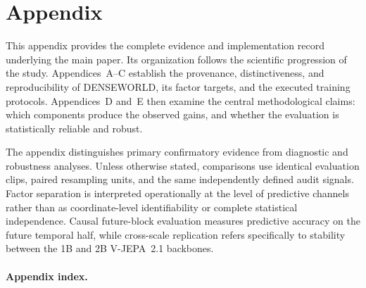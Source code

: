 \appendix
\setcounter{secnumdepth}{2} %

\section*{Appendix}

This appendix provides the complete evidence and implementation record
underlying the main paper. Its organization follows the scientific
progression of the study. Appendices~A--C establish the provenance,
distinctiveness, and reproducibility of DENSEWORLD, its factor targets,
and the executed training protocols. Appendices~D and~E then examine the
central methodological claims: which components produce the observed
gains, and whether the evaluation is statistically reliable and robust.

The appendix distinguishes primary confirmatory evidence from
diagnostic and robustness analyses. Unless otherwise stated,
comparisons use identical evaluation clips, paired resampling units,
and the same independently defined audit signals. Factor separation is
interpreted operationally at the level of predictive channels rather
than as coordinate-level identifiability or complete statistical
independence. Causal future-block evaluation measures predictive accuracy
on the future temporal half, while cross-scale replication refers specifically to
stability between the 1B and 2B V-JEPA~2.1 backbones.

\paragraph{Appendix index.}

